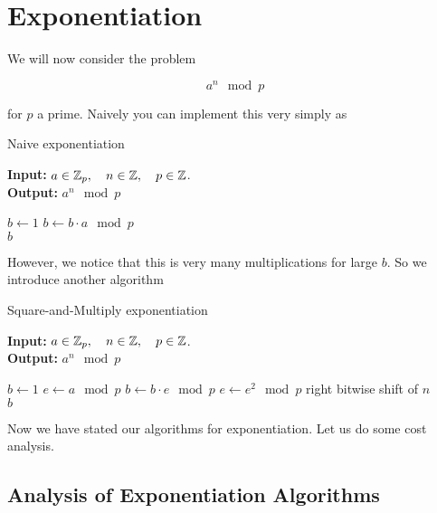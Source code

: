 \section{Exponentiation}

We will now consider the problem 

\begin{equation}
  a^n \mod{p}
  \label{eq:exp}
\end{equation}

for $p$ a prime. Naively you can implement this very simply as

\begin{algorithm}
  \caption{Naive exponentiation}
  \label{alg:naive_exp}
  \textbf{Input:} $a \in \mathbb{Z}_p, \quad n \in \mathbb{Z}, \quad p \in \mathbb{Z}$. \\
  \textbf{Output:} $a^n \mod{p}$
  \begin{algorithmic}[1]
    \State $b \gets 1$
      \State $b \gets b \cdot a \mod{p}$
    \EndFor \\
    \Return $b$
  \end{algorithmic}
\end{algorithm}

However, we notice that this is very many multiplications for large $b$.
So we introduce another algorithm

\begin{algorithm}
  \caption{Square-and-Multiply exponentiation}
  \label{alg:square-and-multiply}
  \textbf{Input:} $a \in \mathbb{Z}_p, \quad n \in \mathbb{Z}, \quad p \in \mathbb{Z}$. \\
  \textbf{Output:} $a^n \mod{p}$
  \begin{algorithmic}[1]
    \State $b \gets 1$
    \State $e \gets a \mod{p}$
        \State $b \gets b \cdot e \mod{p}$
      \EndIf
      \State $e \gets e^2 \mod{p}$
      \State right bitwise shift of $n$
    \EndWhile \\
    \Return $b$
  \end{algorithmic}
\end{algorithm}


Now we have stated our algorithms for exponentiation. Let us do some cost analysis. \\


\subsection{Analysis of Exponentiation Algorithms}

